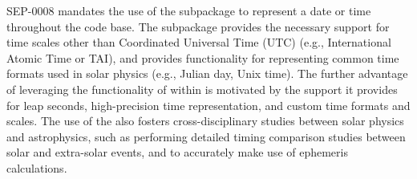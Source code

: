SEP-0008 \citep{sep-0008} mandates the use of the  subpackage to represent a date or time throughout the \sunpypkg code base.
The  subpackage provides the necessary support for time scales other than Coordinated Universal Time (UTC) (e.g., International Atomic Time or TAI), and provides functionality for representing common time formats used in solar physics (e.g., Julian day, Unix time).
The further advantage of leveraging the functionality of  within \sunpypkg is motivated by the support it provides for leap seconds, high-precision time representation, and custom time formats and scales.
The use of the  also fosters cross-disciplinary studies between solar physics and astrophysics, such as performing detailed timing comparison studies between solar and extra-solar events, and to accurately make use of ephemeris calculations.
